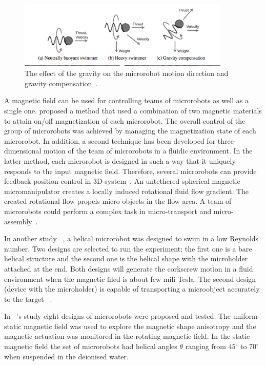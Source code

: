 \documentclass[12pt,a4paper,titlepage]{report}
\begin{document}
\begin{figure}
  \centering
    \includegraphics[width=0.9\textwidth]{11}
  \caption[Effect of gravity on swimming microrobot]{The effect of the 
gravity on the microrobot motion direction and gravity compensation~\citep{mahoney2011velocity}.}
  \label{11}
\end{figure}


A magnetic field can be used for controlling teams of microrobots as well as a single 
one. \citeauthor{kim2013fabrication} proposed a method that used a combination of two magnetic materials to 
attain on/off magnetization of each microrobot. The overall control of the group of microrobots 
was achieved by managing the magnetization state of each microrobot. In addition, a second technique has been 
developed for three-dimensional motion of the team of microrobots in a fluidic environment. In
 the latter method, each microrobot is designed in such a way that it uniquely responds to the 
input magnetic field. Therefore, several microrobots can provide feedback position control in 
3D system~\citep{kim2013fabrication}.
An untethered spherical magnetic micromanipulator creates a locally induced rotational fluid flow gradient. 
The created rotational flow propels micro-objects in the flow area. A team of microrobots could perform
 a complex task in micro-transport and micro-assembly~\citep{kim2013fabrication}.

In another study ~\citep{tottori2012magnetic}, a helical microrobot was designed to swim in a low Reynolds number. 
Two designs are selected to run the experiment;  the first one is a bare helical structure and the second one is the
 helical shape with the microholder attached at the end. Both designs will generate the corkscrew
 motion in a fluid environment when the magnetic filed is about few mili Tesla. The second 
design (device with the microholder) is capable of transporting a microobject accurately to the 
target ~\citep{tottori2012magnetic}.


In ~\citeauthor{tottori2012magnetic}\rq{}s study eight designs of microrobots were proposed and tested. 
The uniform static magnetic field was used to explore the magnetic shape anisotropy and the 
magnetic actuation was monitored in the rotating magnetic field. In the static magnetic field the 
set of microrobots had helical angles $\theta$ ranging from ${45^{\circ}}$ to ${70^{\circ}}$ when suspended in the deionised water. 
\end{document}
